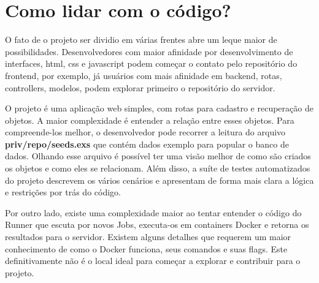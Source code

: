 \section{Como lidar com o código?}
\label{cap:como-lidar-com-codigo}

 O fato de o projeto ser dividio em várias frentes abre um
 leque maior de possibilidades. Desenvolvedores com maior afinidade
 por desenvolvimento de interfaces, html, css e javascript podem começar o
 contato pelo repositório do frontend, por exemplo, já usuários com mais
 afinidade em backend, rotas, controllers, modelos, podem explorar primeiro
 o repositório do servidor.

 O projeto é uma aplicação web simples, com rotas para cadastro e recuperação
 de objetos. A maior complexidade é entender a relação entre esses objetos. Para
 compreende-los melhor, o desenvolvedor pode recorrer a leitura do 
 arquivo \textbf{priv/repo/seeds.exs} que contém dados exemplo para popular
 o banco de dados. Olhando esse arquivo é possível
 ter uma visão melhor de como são criados os objetos e como eles se relacionam.
 Além disso, a suíte de testes automatizados do projeto descrevem os vários
 cenários e apresentam de forma mais clara a lógica e restrições por trás do código.

 Por outro lado, existe uma complexidade maior ao tentar entender o código do
 Runner que escuta por novos Jobs, executa-os em containers Docker e retorna
 os resultados para o servidor. Existem alguns detalhes que requerem um maior
 conhecimento de como o Docker funciona, seus comandos e suas flags. Este definitivamente
 não é o local ideal para começar a explorar e contribuir para o projeto.


